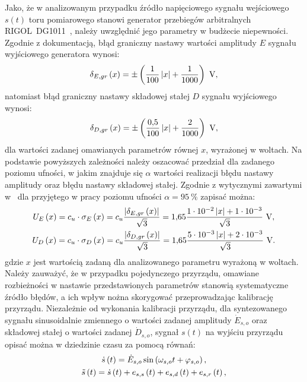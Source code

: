 Jako, że w analizowanym przypadku źródło napięciowego sygnału wejściowego $s(t)$ toru pomiarowego stanowi generator przebiegów arbitralnych RIGOL~DG1011~\cite{rigol_fawg}, należy uwzględnić jego parametry w budżecie niepewności. Zgodnie z dokumentacją, błąd graniczny nastawy wartości amplitudy $E$ sygnału wyjściowego generatora wynosi:
\begin{equation}
\delta_{E,gr} \emb{x} = \pm \emb{\frac{1}{100} \left| x \right| + \frac{1}{1000}} ~\unit{V} \label{eq:pom_gen_amperr_max},
\end{equation}
natomiast błąd graniczny nastawy składowej stałej $D$ sygnału wyjściowego wynosi:
\begin{equation}
\delta_{D,gr} \emb{x} = \pm \emb{\frac{\num{0.5}}{100} \left| x \right| + \frac{2}{1000}} ~\unit{V} \label{eq:pom_gen_shferr_max},
\end{equation}
dla wartości zadanej omawianych parametrów równej $x$, wyrażonej w woltach. Na podstawie powyższych zależności należy oszacować przedział dla zadanego poziomu ufności, w jakim znajduje się $\alpha$ wartości realizacji błędu nastawy amplitudy oraz błędu nastawy składowej stałej. Zgodnie z wytycznymi zawartymi w~\cite{jcgm_guide} dla przyjętego w pracy poziomu ufności $\alpha = \qty{95}{\percent}$ zapisać można:
\begin{gather}
U_{E} \emb{x} = c_{u} \cdot \sigma_{E} \emb{x} = c_{u} \frac{\left| \delta_{E,gr} \emb{x} \right|}{\sqrt{3}} = \num{1.65} \frac{\num{1e-2} \left| x \right| + \num{1e-3}}{\sqrt{3}} ~\unit{V} \label{eq:pom_gen_amperr_unc}, \\
U_{D} \emb{x} = c_{u} \cdot \sigma_{D} \emb{x} = c_{u} \frac{\left| \delta_{D,gr} \emb{x} \right|}{\sqrt{3}} = \num{1.65} \frac{\num{5e-3} \left| x \right| + \num{2e-3}}{\sqrt{3}} ~\unit{V} \label{eq:pom_gen_shferr_unc}.
\end{gather}
gdzie $x$ jest wartością zadaną dla analizowanego parametru wyrażoną w woltach. Należy zauważyć, że w przypadku pojedynczego przyrządu, omawiane rozbieżności w nastawie przedstawionych parametrów stanowią systematyczne źródło błędów, a ich wpływ nożna skorygować przeprowadzając kalibrację przyrządu. Niezależnie od wykonania kalibracji przyrządu, dla syntezowanego sygnału sinusoidalnie zmiennego o wartości zadanej amplitudy $\dot{E}_{s,o}$ oraz składowej stałej o wartości zadanej $\dot{D}_{s,o}$, sygnał $s(t)$ na wyjściu przyrządu opisać można w dziedzinie czasu za pomocą równań:
\begin{gather}
\dot{s} \left(t\right) = \dot{E}_{s,o} \sin \left(\omega_{s,o} t + \varphi_{s,o}\right) \label{eq:pom_gen_out_ideal}, \\
\tilde{s} \left(t\right) = \dot{s} \left(t\right) + e_{s,s} \left(t\right) + e_{s,d} \left(t\right) + e_{s,r} \left(t\right)\label{eq:pom_gen_out_real},
\end{gather}
